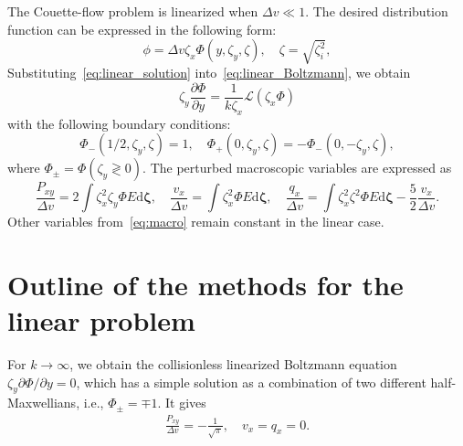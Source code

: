 \documentclass[]{elsarticle} %
\newcommand{\dd}{\mathrm{d}}
\newcommand{\pder}[2][]{\frac{\partial#1}{\partial#2}}
\newcommand{\Pder}[2][]{\partial#1/\partial#2}
\newcommand{\dzeta}{\boldsymbol{\dd\zeta}}
\begin{document}
The Couette-flow problem is linearized when \(\Delta{v}\ll 1\).
The desired distribution function can be expressed in the following form:
\begin{equation}\label{eq:linear_solution}
    \phi = \Delta{v} \zeta_x \Phi(y,\zeta_y,\zeta), \quad \zeta = \sqrt{\zeta_i^2},
\end{equation}
Substituting~\eqref{eq:linear_solution} into~\eqref{eq:linear_Boltzmann}, we obtain
\begin{equation}\label{eq:linear_equation}
    \zeta_y \pder[\Phi]{y} = \frac1{k\zeta_x}\mathcal{L}(\zeta_x\Phi)
\end{equation}
with the following boundary conditions:
\begin{equation}\label{eq:linear_bc}
    \Phi_-(1/2,\zeta_y,\zeta) = 1, \quad \Phi_+(0,\zeta_y,\zeta) = -\Phi_-(0,-\zeta_y,\zeta),
\end{equation}
where \(\Phi_\pm = \Phi(\zeta_y \gtrless 0)\).
The perturbed macroscopic variables are expressed as
\begin{equation}\label{eq:linear_macro}
    \frac{P_{xy}}{\Delta{v}} = 2\int \zeta_x^2 \zeta_y \Phi E\dzeta, \quad
    \frac{v_x}{\Delta{v}} = \int \zeta_x^2 \Phi E\dzeta, \quad
    \frac{q_x}{\Delta{v}} = \int \zeta_x^2 \zeta^2 \Phi E\dzeta - \frac52 \frac{v_x}{\Delta{v}}.
\end{equation}
Other variables from~\eqref{eq:macro} remain constant in the linear case.

\section{Outline of the methods for the linear problem}

For \(k\to\infty\), we obtain the collisionless linearized Boltzmann equation \(\zeta_y\Pder[\Phi]{y} = 0\),
which has a simple solution as a combination of two different half-Maxwellians, i.e., \(\Phi_\pm = \mp 1\).
It gives
\begin{gather}\label{eq:linear_free_macro}
    \frac{P_{xy}}{\Delta{v}} = -\frac1{\sqrt{\pi}}, \quad v_x = q_x = 0.
\end{gather}
\end{document}
